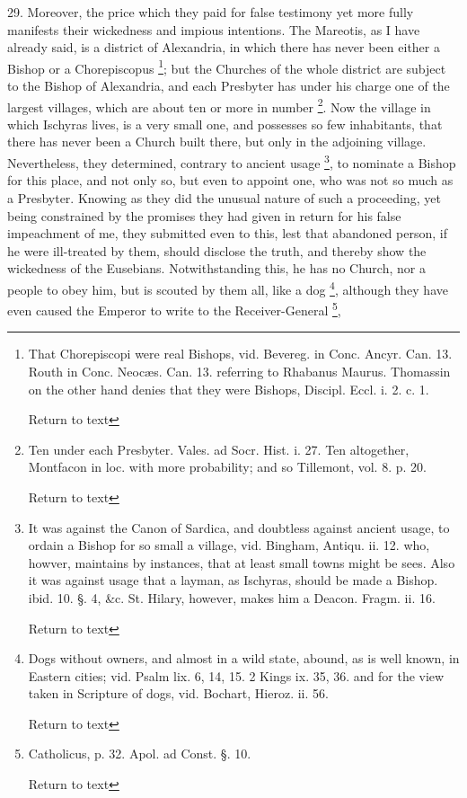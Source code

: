 29. Moreover, the price which they paid for false
testimony yet more fully manifests their wickedness and impious
intentions. The Mareotis, as I have already said, is a district of
Alexandria, in which there has never been either a Bishop or a
Chorepiscopus \footnote{That Chorepiscopi were real Bishops, vid. Bevereg. in Conc. Ancyr.
Can. 13. Routh in Conc. Neocæs. Can. 13. referring to Rhabanus Maurus.
Thomassin on the other hand denies that they were Bishops, Discipl.
Eccl. i. 2. c. 1.

Return to text}; but the
Churches of the whole district are subject to the Bishop of
Alexandria, and each Presbyter has under his charge one of the largest
villages, which are about ten or more in number \footnote{Ten under each Presbyter. Vales. ad Socr. Hist. i. 27. Ten altogether,
Montfacon in loc. with more probability; and so Tillemont, vol. 8. p.
20.

Return to text}. Now the village in which Ischyras lives, is a very small one,
and possesses so few inhabitants, that there has never been a Church
built there, but only in the adjoining village. Nevertheless,
they determined, contrary to ancient usage \footnote{It was against the Canon of Sardica, and doubtless against ancient
usage, to ordain a Bishop for so small a village, vid. Bingham, Antiqu.
ii. 12. who, howver, maintains by instances, that at least small towns
might be sees. Also it was against usage that a layman, as Ischyras,
should be made a Bishop. ibid. 10. §. 4, \&c. St. Hilary, however,
makes him a Deacon. Fragm. ii. 16.

Return to text}, to nominate a Bishop for this place, and not only so, but even
to appoint one, who was not so much as a Presbyter. Knowing as they
did the unusual nature of such a proceeding, yet being constrained by
the promises they had given in return for his false impeachment of me,
they submitted even to this, lest that abandoned person, if he were
ill-treated by them, should disclose the truth, and thereby show the
wickedness of the Eusebians. Notwithstanding this, he has no Church,
nor a people to obey him, but is scouted by them all, like a dog \footnote{Dogs without owners, and almost in a wild state, abound, as is well
known, in Eastern cities; vid. Psalm lix. 6, 14, 15. 2 Kings ix. 35,
36. and for the view taken in Scripture of dogs, vid. Bochart, Hieroz.
ii. 56.

Return to text}, although they have even caused the Emperor to write to the
Receiver-General \footnote{Catholicus, p. 32. Apol. ad Const. §. 10.

Return to text},
